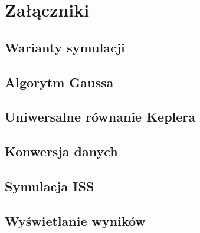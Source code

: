 \section*{Załączniki}

\subsection{Warianty symulacji}

     
     

\subsection{Algorytm Gaussa}
     
     
     

\subsection{Uniwersalne równanie Keplera}
     
     
     
    
\subsection{Konwersja danych}
     
     
     
       
\subsection{Symulacja ISS}
       

\subsection{Wyświetlanie wyników}
     
     
     

